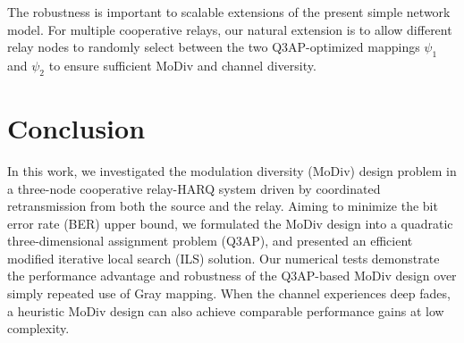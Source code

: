 \documentclass[journal]{IEEEtran}
\begin{document}
The robustness is important to scalable extensions of the present simple network
model. For multiple cooperative relays, our natural extension is to allow
different relay nodes to randomly select between the two Q3AP-optimized mappings
$\psi_1$ and $\psi_2$ to ensure sufficient MoDiv and channel diversity. 

\section{Conclusion}
\label{sec:conclusion}
In this work, we investigated the modulation diversity (MoDiv) design problem in
a three-node cooperative relay-HARQ system driven by coordinated retransmission
from both the source and the relay. Aiming to minimize the bit error rate (BER)
upper bound, we formulated the MoDiv design into a quadratic three-dimensional
assignment problem (Q3AP), and presented an efficient modified iterative local
search (ILS) solution. Our numerical tests demonstrate the performance advantage
and robustness of the Q3AP-based MoDiv design over simply repeated use of
Gray mapping. When the channel experiences deep fades, a heuristic MoDiv design
can also achieve comparable performance gains at low complexity.













%




\end{document}
